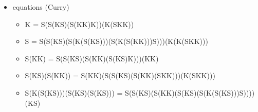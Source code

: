 \documentclass[a4paper,UKenglish]{article}
\begin{document}
\begin{itemize}
  \item equations (Curry)
    \begin{itemize}
      \item K = S(S(KS)(S(KK)K))(K(SKK))
      \item S = S(S(KS)(S(K(S(KS)))(S(K(S(KK)))S)))(K(K(SKK)))
      \item S(KK) = S(S(KS)(S(KK)(S(KS)K)))(KK)
      \item S(KS)(S(KK)) = S(KK)(S(S(KS)(S(KK)(SKK)))(K(SKK)))
      \item S(K(S(KS)))(S(KS)(S(KS))) = S(S(KS)(S(KK)(S(KS)(S(K(S(KS)))S))))(KS)
    \end{itemize}
\end{itemize}



\end{document}
